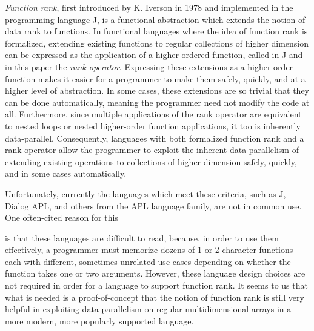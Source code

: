\textit{Function rank}, first introduced by K. Iverson in 1978\cite{opandfunc} and implemented in the programming language J, is a functional abstraction which extends the notion of data rank to functions. %
In functional languages where the idea of function rank is formalized, extending existing functions to regular collections of higher dimension can be expressed as the application of a higher-ordered function, 
called in J and in this paper the \textit{rank operator}. %
Expressing these extensions as a higher-order function makes it easier for a programmer to make them safely, quickly, and at a higher level of abstraction.
In some cases, these extensions are so trivial that they can be done automatically, meaning the programmer need not modify the code at all. %
Furthermore, since multiple applications of the rank operator are equivalent to nested loops or nested higher-order function applications, it too is inherently data-parallel.
Consequently, languages with both formalized function rank and a rank-operator allow the programmer to 
exploit the inherent data parallelism of extending existing operations to collections of higher dimension safely, quickly, and in some cases automatically.

Unfortunately, currently the languages which meet these criteria, such as J, Dialog APL, and others from the APL language family, are not in common use.
One often-cited reason for this \begin{comment}TODO cite\end{comment} is that these languages are difficult to read, 
because, in order to use them effectively, a programmer must memorize dozens of 1 or 2 character functions each with different, sometimes unrelated use cases depending on whether the function takes one or two arguments. %
However, these language design choices are not required in order for a language to support function rank.
It seems to us that what is needed is a proof-of-concept that the notion of function rank is still very helpful in exploiting data parallelism on regular multidimensional arrays in a more modern, more popularly supported language.

